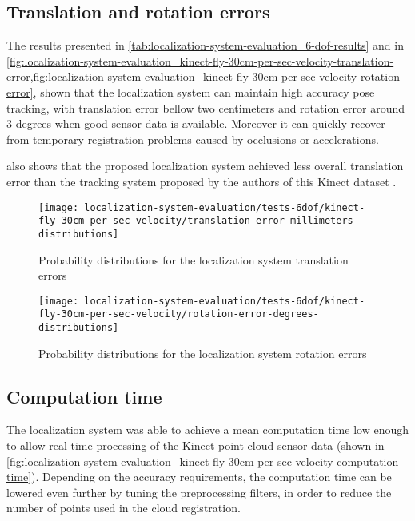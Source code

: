 \subsection{Translation and rotation errors}

The results presented in \cref{tab:localization-system-evaluation_6-dof-results} and in \cref{fig:localization-system-evaluation_kinect-fly-30cm-per-sec-velocity-translation-error,fig:localization-system-evaluation_kinect-fly-30cm-per-sec-velocity-rotation-error}, shown that the localization system can maintain high accuracy pose tracking, with translation error bellow two centimeters and rotation error around 3 degrees when good sensor data is available. Moreover it can quickly recover from temporary registration problems caused by occlusions or accelerations.

 also shows that the proposed localization system achieved less overall translation error than the tracking system proposed by the authors of this Kinect dataset \cite{Pomerleau2011}.


\begin{figure}[H]
	\centering
	\begin{minipage}[H]{0.45\textwidth}
		\centering
		\texttt{[image: localization-system-evaluation/tests-6dof/kinect-fly-30cm-per-sec-velocity/translation-error-millimeters-distributions]}
		\caption{Probability distributions for the localization system translation errors}
		\label{fig:localization-system-evaluation_kinect-fly-30cm-per-sec-velocity-translation-error}
	\end{minipage}\hfill
	\begin{minipage}[H]{0.45\textwidth}
		\centering
		\texttt{[image: localization-system-evaluation/tests-6dof/kinect-fly-30cm-per-sec-velocity/rotation-error-degrees-distributions]}
		\caption{Probability distributions for the localization system rotation errors}
		\label{fig:localization-system-evaluation_kinect-fly-30cm-per-sec-velocity-rotation-error}
	\end{minipage}
\end{figure}


\subsection{Computation time}

The localization system was able to achieve a mean computation time low enough to allow real time processing of the Kinect point cloud sensor data (shown in \cref{fig:localization-system-evaluation_kinect-fly-30cm-per-sec-velocity-computation-time}). Depending on the accuracy requirements, the computation time can be lowered even further by tuning the preprocessing filters, in order to reduce the number of points used in the cloud registration.


